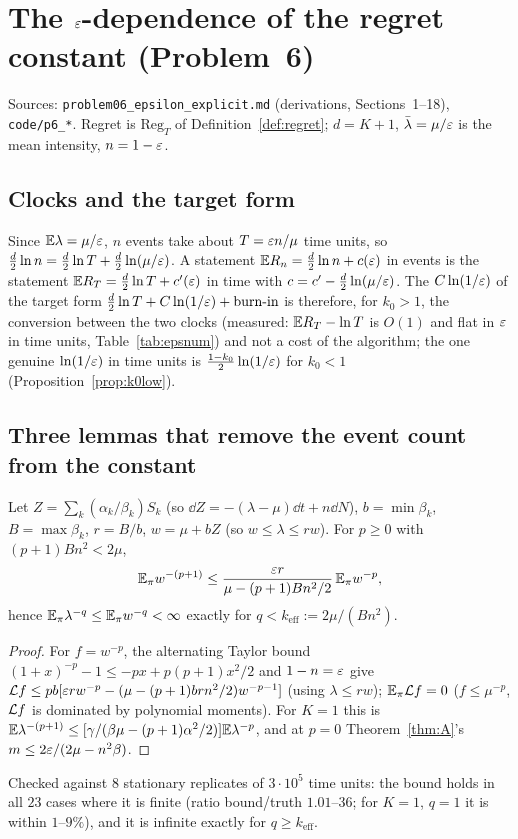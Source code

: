 \section{The $\varepsilon$-dependence of the regret constant (Problem~6)}\label{sec:epsdep}

Sources: \texttt{problem06\_epsilon\_explicit.md} (derivations, Sections~1--18), \texttt{code/p6\_*}. Regret is $\mathrm{Reg}_T$ of Definition~\ref{def:regret}; $d=K+1$, $\bar\lambda=\mu/\varepsilon$ is the mean intensity, $n=1-\varepsilon$.

\subsection{Clocks and the target form}\label{sec:eps-clock}
Since $\mathbb{E}\lambda=\mu/\varepsilon$, $n$ events take about $T=\varepsilon n/\mu$ time units, so $\tfrac d2\ln n=\tfrac d2\ln T+\tfrac d2\ln(\mu/\varepsilon)$. A statement $\mathbb{E} R_n=\tfrac d2\ln n+c(\varepsilon)$ in events is the statement $\mathbb{E} R_T=\tfrac d2\ln T+c'(\varepsilon)$ in time with $c=c'-\tfrac d2\ln(\mu/\varepsilon)$. The $C\ln(1/\varepsilon)$ of the target form $\tfrac d2\ln T+C\ln(1/\varepsilon)+\text{burn-in}$ is therefore, for $k_0>1$, the conversion between the two clocks (measured: $\mathbb{E} R_T-\ln T$ is $O(1)$ and flat in $\varepsilon$ in time units, Table~\ref{tab:epsnum}) and not a cost of the algorithm; the one genuine $\ln(1/\varepsilon)$ in time units is $\tfrac{1-k_0}2\ln(1/\varepsilon)$ for $k_0<1$ (Proposition~\ref{prop:k0low}).

\subsection{Three lemmas that remove the event count from the constant}\label{sec:eps-lemmas}

\begin{lemma}\label{lem:negmom}\Pt{}
Let $Z=\sum_k(\alpha_k/\beta_k)S_k$ (so $\dd Z=-(\lambda-\mu)\dd t+n\dd N$), $b=\min\beta_k$, $B=\max\beta_k$, $r=B/b$, $w=\mu+bZ$ (so $w\le\lambda\le rw$). For $p\ge0$ with $(p+1)Bn^2<2\mu$,
\[
\mathbb{E}_\pi w^{-(p+1)}\le\frac{\varepsilon r}{\mu-(p+1)Bn^2/2}\,\mathbb{E}_\pi w^{-p},
\]
hence $\mathbb{E}_\pi\lambda^{-q}\le\mathbb{E}_\pi w^{-q}<\infty$ exactly for $q<k_{\mathrm{eff}}:=2\mu/(Bn^2)$.
\end{lemma}
\begin{proof}
For $f=w^{-p}$, the alternating Taylor bound $(1+x)^{-p}-1\le-px+p(p+1)x^2/2$ and $1-n=\varepsilon$ give $\mathcal L f\le pb[\varepsilon r w^{-p}-(\mu-(p+1)br n^2/2)w^{-p-1}]$ (using $\lambda\le rw$); $\mathbb{E}_\pi\mathcal L f=0$ ($f\le\mu^{-p}$, $\mathcal L f$ is dominated by polynomial moments). For $K=1$ this is $\mathbb{E}\lambda^{-(p+1)}\le[\gamma/(\beta\mu-(p+1)\alpha^2/2)]\mathbb{E}\lambda^{-p}$, and at $p=0$ Theorem~\ref{thm:A}'s $m\le2\varepsilon/(2\mu-n^2\beta)$.
\end{proof}
Checked against $8$ stationary replicates of $3\cdot10^5$ time units: the bound holds in all $23$ cases where it is finite (ratio bound/truth $1.01$--$36$; for $K=1$, $q=1$ it is within $1$--$9\%$), and it is infinite exactly for $q\ge k_{\mathrm{eff}}$.

